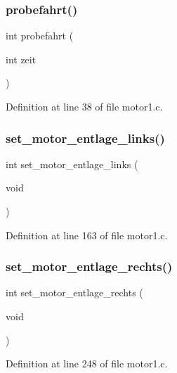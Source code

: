 \mbox{\label{_motor1_8h_aa3482fd571b315d112e8514a1b765b75}} 
\subsubsection{probefahrt()}
{\footnotesize\ttfamily int probefahrt (\begin{DoxyParamCaption}\item[{int}]{zeit }\end{DoxyParamCaption})}



Definition at line 38 of file motor1.\+c.

\mbox{\label{_motor1_8h_a8168802a949dff7a8df33ff38eaf0d20}} 
\subsubsection{set\+\_\+motor\+\_\+entlage\+\_\+links()}
{\footnotesize\ttfamily int set\+\_\+motor\+\_\+entlage\+\_\+links (\begin{DoxyParamCaption}\item[{void}]{ }\end{DoxyParamCaption})}



Definition at line 163 of file motor1.\+c.

\mbox{\label{_motor1_8h_ae7371f4fed363ba54f2f894ac3720c06}} 
\subsubsection{set\+\_\+motor\+\_\+entlage\+\_\+rechts()}
{\footnotesize\ttfamily int set\+\_\+motor\+\_\+entlage\+\_\+rechts (\begin{DoxyParamCaption}\item[{void}]{ }\end{DoxyParamCaption})}



Definition at line 248 of file motor1.\+c.

